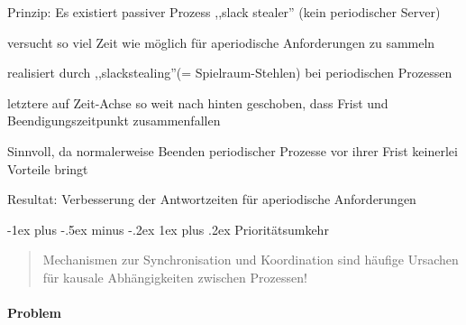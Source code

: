 \documentclass[a4paper]{article}
\makeatletter
\renewcommand{\subsubsection}{\@startsection{subsubsection}{3}{0mm}%
 {-1ex plus -.5ex minus -.2ex}%
 {1ex plus .2ex}%
 {\normalfont\small\bfseries}}
\makeatother
\begin{document}
\begin{multicols}{3}
    \begin{itemize*}
        \item
        Prinzip: Es existiert passiver Prozess ,,slack stealer'' (kein
        periodischer Server)
        \item
        versucht so viel Zeit wie möglich für aperiodische Anforderungen zu
        sammeln
        \item
        realisiert durch ,,slackstealing''(= Spielraum-Stehlen) bei
        periodischen Prozessen
        \item
        letztere auf Zeit-Achse so weit nach hinten geschoben, dass Frist und
        Beendigungszeitpunkt zusammenfallen
        \item
        Sinnvoll, da normalerweise Beenden periodischer Prozesse vor ihrer
        Frist keinerlei Vorteile bringt
        \item
        Resultat: Verbesserung der Antwortzeiten für aperiodische
        Anforderungen
    \end{itemize*}


    \subsubsection{Prioritätsumkehr}

    \begin{quote}
        Mechanismen zur Synchronisation und Koordination sind häufige Ursachen
        für kausale Abhängigkeiten zwischen Prozessen!
    \end{quote}


    \paragraph{Problem}


\end{multicols}
\end{document}
